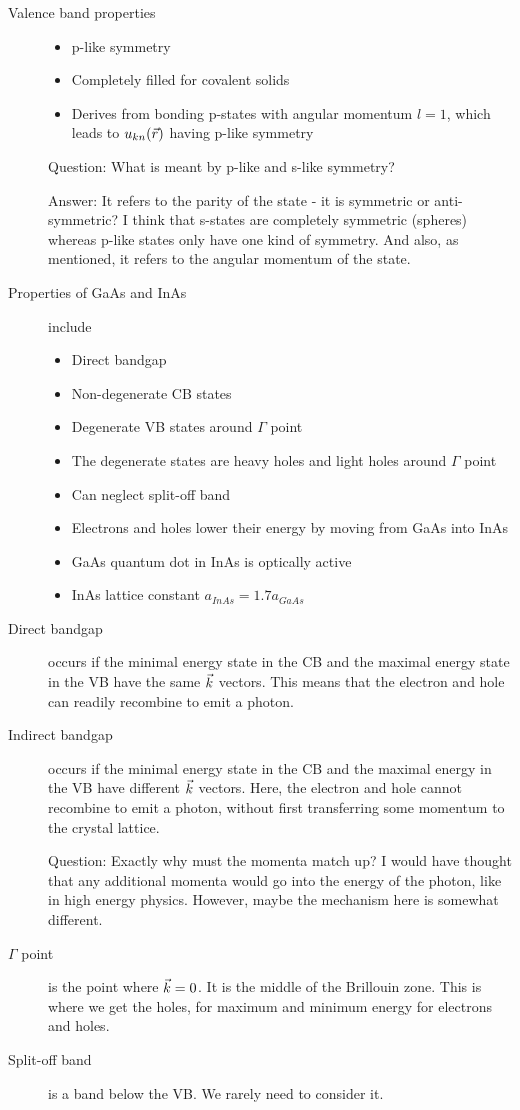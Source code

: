 \begin{description}
\item[Valence band properties]
\begin{itemize}
\item p-like symmetry
\item Completely filled for covalent solids
\item Derives from bonding p-states with angular momentum $l = 1$, which leads to $u_{kn}(\vec{r})$ having p-like symmetry
\end{itemize}

Question: What is meant by p-like and s-like symmetry?

Answer: It refers to the parity of the state - it is symmetric or anti-symmetric? I think that s-states are completely symmetric (spheres) whereas p-like states only have one kind of symmetry. And also, as mentioned, it refers to the angular momentum of the state. 

\item[Properties of GaAs and InAs] include
\begin{itemize}
\item Direct bandgap
\item Non-degenerate CB states
\item Degenerate VB states around $\Gamma$ point
\item The degenerate states are heavy holes and light holes around $\Gamma$ point
\item Can neglect split-off band
\item Electrons and holes lower their energy by moving from GaAs into InAs
\item GaAs quantum dot in InAs is optically active
\item InAs lattice constant $a_{InAs} = 1.7 a_{GaAs}$
\end{itemize}

\item[Direct bandgap] occurs if the minimal energy state in the CB and the maximal energy state in the VB have the same $\vec{k}$ vectors. This means that the electron and hole can readily recombine to emit a photon. 

\item[Indirect bandgap] occurs if the minimal energy state in the CB and the maximal energy in the VB have different $\vec{k}$ vectors. Here, the electron and hole cannot recombine to emit a photon, without first transferring some momentum to the crystal lattice. 

Question: Exactly why must the momenta match up? I would have thought that any additional momenta would go into the energy of the photon, like in high energy physics. However, maybe the mechanism here is somewhat different. 

\item[$\Gamma $ point] is the point where $\vec{k} = 0$. It is the middle of the Brillouin zone. This is where we get the holes, for maximum and minimum energy for electrons and holes. 


\item[Split-off band] is a band below the VB. We rarely need to consider it. 

\end{description}
